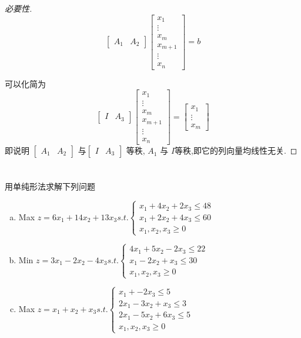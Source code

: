 \documentclass[a4paper]{article}
\begin{document}
\begin{proof}[必要性]
\[ \begin{bmatrix} A_1&  A_2\end{bmatrix} \begin{bmatrix}
    x_1 \\ \vdots \\x_m \\ x_{m+1} \\ \vdots \\ x_n
\end{bmatrix} = b\] 

可以化简为 
\[ \begin{bmatrix} I &  A_3\end{bmatrix} \begin{bmatrix}
    x_1 \\ \vdots \\x_m \\ x_{m+1} \\ \vdots \\ x_n
\end{bmatrix} = \begin{bmatrix}
    x_1 \\ \vdots \\ x_m
\end{bmatrix}\] 
即说明 $\begin{bmatrix} A_1&  A_2\end{bmatrix}$ 与$ \begin{bmatrix} I &  A_3\end{bmatrix}$ 等秩, $A_1$ 与 $I$等秩,即它的列向量均线性无关.
\end{proof}

\section{}

用单纯形法求解下列问题
\begin{enumerate}[a)]
    \item Max $z = 6x_1  +14x_2  + 13x_3 s.t. \left\{ \begin{aligned}
        x_1 + 4x_2 + 2x_3  \leq 48 \\
        x_1 + 2x_2 + 4x_3 \leq 60\\
        x_1 , x_2 , x_3 \geq 0
    \end{aligned}\right.$
    \item Min $z = 3x_1 - 2x_2  -4x_3 s.t. \left\{ \begin{aligned}
        4x_1 + 5x_2 - 2x_3  \leq 22 \\
        x_1 - 2x_2 + x_3 \leq 30\\
        x_1 , x_2 , x_3 \geq 0
    \end{aligned}\right.$
    \item Max $z = x_1 +x_2  +x_3 s.t. \left\{ \begin{aligned}
        x_1 + - 2x_3  \leq 5 \\
        2x_1 - 3x_2 + x_3 \leq 3\\
        2x_1 - 5x_2 + 6x_3 \leq 5\\
        x_1 , x_2 , x_3 \geq 0
    \end{aligned}\right.$
\end{enumerate}
    
\end{document}
